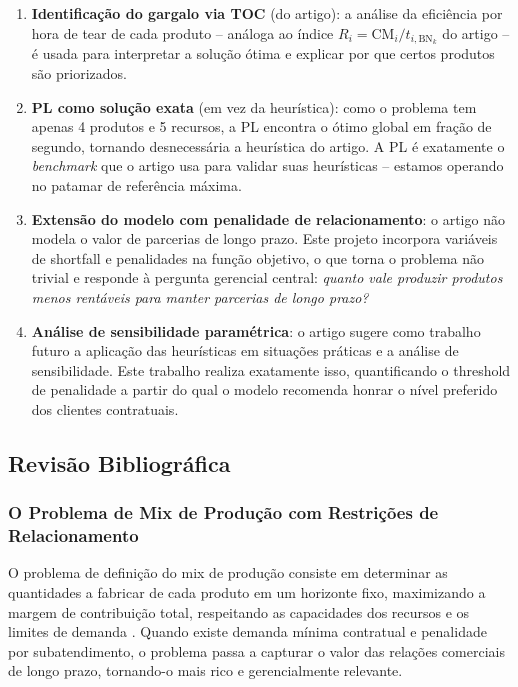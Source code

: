 \begin{enumerate}[label=\textbf{(\roman*)}]
  \item \textbf{Identificação do gargalo via TOC} (do artigo): a análise da
        eficiência por hora de tear de cada produto -- análoga ao índice
        $R_i = \mathrm{CM}_i / t_{i,\mathrm{BN}_k}$ do artigo -- é usada para
        interpretar a solução ótima e explicar por que certos produtos são
        priorizados.

  \item \textbf{PL como solução exata} (em vez da heurística): como o problema
        tem apenas 4 produtos e 5 recursos, a PL encontra o ótimo global em
        fração de segundo, tornando desnecessária a heurística do artigo. A PL
        é exatamente o \textit{benchmark} que o artigo usa para validar suas
        heurísticas -- estamos operando no patamar de referência máxima.

  \item \textbf{Extensão do modelo com penalidade de relacionamento}: o artigo
        não modela o valor de parcerias de longo prazo. Este projeto incorpora
        variáveis de shortfall e penalidades na função objetivo, o que torna o
        problema não trivial e responde à pergunta gerencial central: \textit{quanto
        vale produzir produtos menos rentáveis para manter parcerias de longo prazo?}

  \item \textbf{Análise de sensibilidade paramétrica}: o artigo sugere como
        trabalho futuro a aplicação das heurísticas em situações práticas e a
        análise de sensibilidade. Este trabalho realiza exatamente isso,
        quantificando o threshold de penalidade a partir do qual o modelo
        recomenda honrar o nível preferido dos clientes contratuais.
\end{enumerate}

\newpage

\subsection{Revisão Bibliográfica}

\subsubsection{O Problema de Mix de Produção com Restrições de Relacionamento}

O problema de definição do mix de produção consiste em determinar as quantidades
a fabricar de cada produto em um horizonte fixo, maximizando a margem de
contribuição total, respeitando as capacidades dos recursos e os limites de
demanda \cite{hillier2006, arenales2007}. Quando existe demanda mínima contratual
e penalidade por subatendimento, o problema passa a capturar o valor das
relações comerciais de longo prazo, tornando-o mais rico e gerencialmente relevante.

